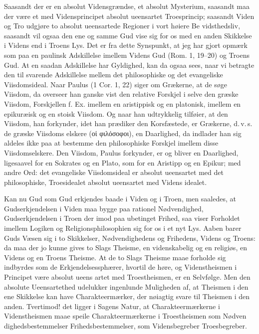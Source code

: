 \documentclass[12pt]{book}
\newcommand{\opage}[1]{\marginnote{\footnotesize\textit{[#1]}}}
\begin{document}
Saasandt der er en absolut Vidensgrændse, et absolut
Mysterium, saasandt maa der være et med Vidensprincipet
\opage{135}\setcounter{footnote}{0}%
absolut ueensartet Troesprincip; saasandt Viden og Tro
udgjøre to absolut ueensartede Regioner i vort høiere Be\-%
vidsthedsliv, saasandt vil ogsaa den ene og samme Gud vise
sig for os med en anden Skikkelse i Videns end i Troens
Lys. Det er fra dette Synspunkt, at jeg har gjort opmærk\-%
som paa en paulinsk Adskillelse imellem Videns Gud (Rom.
1, 19--20) og Troens Gud. At en saadan Adskillelse har
Gyldighed, kan da ogsaa sees, naar vi betragte den til\-%
svarende Adskillelse mellem det philosophiske og det evangeliske
Viisdomsideal. Naar Paulus (1 Cor. 1, 22) siger om
Grækerne, at de søge Viisdom, da overseer han ganske vist
den relative Forskjel i selve den græske Viisdom, Forskjellen
f. Ex. imellem en aristippisk og en platonisk, imellem en
epikuræisk og en stoisk Viisdom. Og naar han udtrykkelig
tilføier, at den Viisdom, han forkynder, idet han prædiker
den Korsfæstede, er Grækerne, d.\,v.\,s. de græske Viisdoms\-%
elskere (οἱ φιλόσοφοι), en Daarlighed, da indlader han sig
aldeles ikke paa at bestemme den philosophiske Forskjel imellem
disse Viisdomselskere. Den Viisdom, Paulus forkynder, er
og bliver en Daarlighed, ligesaavel for en Sokrates og en
Plato, som for en Aristipp og en Epikur; med andre Ord:
det evangeliske Viisdomsideal er absolut ueensartet med det
philosophiske, Troesidealet absolut ueensartet med Videns\-%
idealet.

Kan nu Gud som Gud erkjendes baade i Viden og i
Troen, men saaledes, at Gudserkjendelsen i Viden maa bygge
paa rationel Nødvendighed, Gudserkjendelsen i Troen der\-%
imod paa ubetinget Frihed, saa viser Forholdet imellem Logiken
og Religionsphilosophien sig for os i et nyt Lys. Aaben\-%
barer Guds Væsen sig i to Skikkelser, Nødvendighedens og
Frihedens, Videns og Troens: da maa der jo kunne gives
to Slags Theisme, en videnskabelig og en religiøs, en Videns
og en Troens Theisme. At de to Slags Theisme maae
\opage{136}\setcounter{footnote}{0}%
forholde sig indbyrdes som de Erkjendelsessphærer, hvortil de
høre, og Videnstheismen i Principet være absolut ueens\-%
artet med Troestheismen, er en Selvfølge. Men den absolute
Ueensartethed udelukker ingenlunde Muligheden af, at Theismen
i den ene Skikkelse kan have Charakteermærker, der nøiagtig
svare til Theismen i den anden. Tvertimod! det ligger i
Sagens Natur, at Charakteermærkerne i Videnstheismen maae
speile Charakteermærkerne i Troestheismen som Nødven\-%
dighedsbestemmelser Frihedsbestemmelser, som Vidensbegreber
Troesbegreber.
\end{document}
